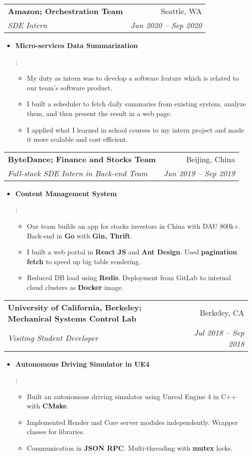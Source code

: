 \documentclass[letterpaper,11pt]{article}
\makeatletter
\newcommand{\resumeItem}[2]{
  \item\small{
    \textbf{#1}{: #2 \vspace{-2pt}}
  }
}
\newcommand{\resumeSubheading}[4]{
  \vspace{-1pt}\item
    \begin{tabular*}{0.97\textwidth}[t]{l@{\extracolsep{\fill}}r}
      \textbf{#1} & #2 \\
      \textit{\small#3} & \textit{\small #4} \\
    \end{tabular*}\vspace{-5pt}
}
\newcommand{\resumeItemListStart}{\begin{itemize}}
\newcommand{\resumeItemListEnd}{\end{itemize}\vspace{-5pt}}
\makeatother
\begin{document}
    \resumeSubheading
      {Amazon; Orchestration Team}{Seattle, WA}
      {SDE Intern}{Jun 2020 -- Sep 2020}
      \resumeItemListStart
        \resumeItem{Micro-services Data Summarization}{
          \begin{itemize}
            \item My duty as intern was to develop a software feature which is related to our team's software product.
            \item I built a scheduler to fetch daily summaries from existing system, analyze them, and then present the result in a web page.
            \item I applied what I learned in school courses to my intern project and made it more scalable and cost efficient.
          \end{itemize}
        }
      \resumeItemListEnd

    \resumeSubheading
      {ByteDance; Finance and Stocks Team}{Beijing, China}
      {Full-stack SDE Intern in Back-end Team}{Jun 2019 -- Sep 2019}
      \resumeItemListStart
        \resumeItem{Content Management System}{
          \begin{itemize}
            \item Our team builds an app for stocks investors in China with DAU 800k+. Back-end in \textbf{Go} with \textbf{Gin, Thrift}.
            \item I built a web portal in \textbf{React JS} and \textbf{Ant Design}. Used \textbf{pagination fetch} to speed up big table rendering.
            \item Reduced DB load using \textbf{Redis}. Deployment from GitLab to internal cloud clusters as \textbf{Docker} image.
          \end{itemize}
        }
      \resumeItemListEnd

    \resumeSubheading
      {University of California, Berkeley; Mechanical Systems Control Lab}{Berkeley, CA}
      {Visiting Student Developer}{Jul 2018 -- Sep 2018}
      \resumeItemListStart
        \resumeItem{Autonomous Driving Simulator in UE4}{
          \begin{itemize}
            \item Built an autonomous driving simulator using Unreal Engine 4 in C++ with \textbf{CMake}.
            \item Implemented Render and Core server modules independently. Wrapper classes for libraries.
            \item Communication in \textbf{JSON RPC}. Multi-threading with \textbf{mutex} locks.
          \end{itemize}
        }
      \resumeItemListEnd
\end{document}
